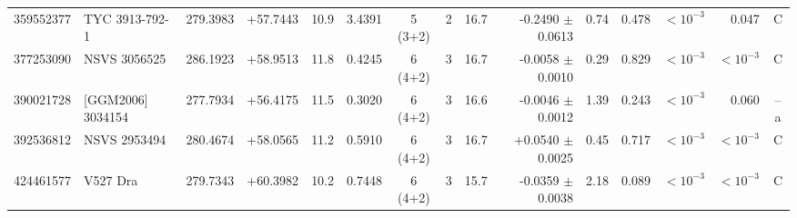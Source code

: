 \documentclass{aa}
\begin{document}
\begin{table}
\begin{tabular}{l l r r r r c c r r r r r r c}
359552377 & TYC 3913-792-1 & 279.3983 & +57.7443 & 10.9 & 3.4391 & 5 (3+2) & 2 & 16.7 & -0.2490 $\pm$ 0.0613 & 0.74 & 0.478 & $<10^{-3}$ & 0.047 & C\\
377253090 & NSVS 3056525 & 286.1923 & +58.9513 & 11.8 & 0.4245 & 6 (4+2) & 3 & 16.7 & -0.0058 $\pm$ 0.0010 & 0.29 & 0.829 & $<10^{-3}$ & $<10^{-3}$ & C\\
390021728 & [GGM2006] 3034154 & 277.7934 & +56.4175 & 11.5 & 0.3020 & 6 (4+2) & 3 & 16.6 & -0.0046 $\pm$ 0.0012 & 1.39 & 0.243 & $<10^{-3}$ & 0.060 & --a\\
392536812 & NSVS 2953494 & 280.4674 & +58.0565 & 11.2 & 0.5910 & 6 (4+2) & 3 & 16.7 & +0.0540 $\pm$ 0.0025 & 0.45 & 0.717 & $<10^{-3}$ & $<10^{-3}$ & C\\
424461577 & V527 Dra & 279.7343 & +60.3982 & 10.2 & 0.7448 & 6 (4+2) & 3 & 15.7 & -0.0359 $\pm$ 0.0038 & 2.18 & 0.089 & $<10^{-3}$ & $<10^{-3}$ & C\\
\hline
\end{tabular}
\end{table}
\end{document}
